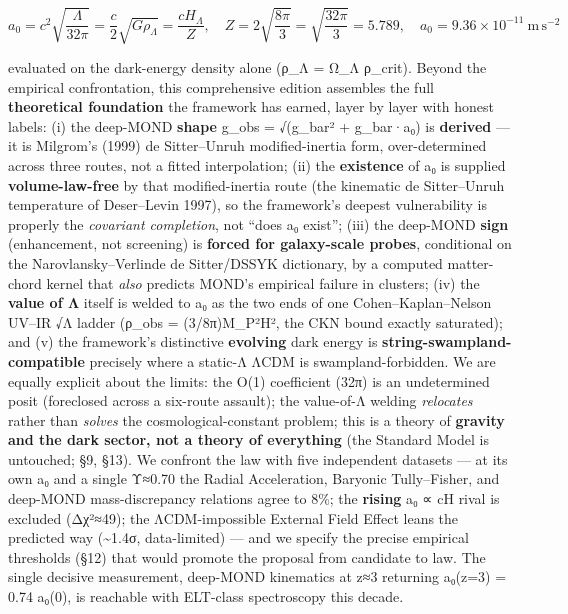 \documentclass[
]{article}
\begin{document}
\[a_0 = c^2\sqrt{\frac{\Lambda}{32\pi}} = \frac{c}{2}\sqrt{G\rho_\Lambda} = \frac{cH_\Lambda}{Z}, \quad Z = 2\sqrt{\frac{8\pi}{3}} = \sqrt{\frac{32\pi}{3}} = 5.789, \quad a_0 = 9.36\times10^{-11}\ \mathrm{m\,s^{-2}}\]

evaluated on the dark-energy density alone (ρ\_Λ = Ω\_Λ ρ\_crit). Beyond
the empirical confrontation, this comprehensive edition assembles the
full \textbf{theoretical foundation} the framework has earned, layer by
layer with honest labels: (i) the deep-MOND \textbf{shape} g\_obs =
√(g\_bar² + g\_bar·a₀) is \textbf{derived} --- it is Milgrom's (1999) de
Sitter--Unruh modified-inertia form, over-determined across three
routes, not a fitted interpolation; (ii) the \textbf{existence} of a₀ is
supplied \textbf{volume-law-free} by that modified-inertia route (the
kinematic de Sitter--Unruh temperature of Deser--Levin 1997), so the
framework's deepest vulnerability is properly the \emph{covariant
completion}, not ``does a₀ exist''; (iii) the deep-MOND \textbf{sign}
(enhancement, not screening) is \textbf{forced for galaxy-scale probes},
conditional on the Narovlansky--Verlinde de Sitter/DSSYK dictionary, by
a computed matter-chord kernel that \emph{also} predicts MOND's
empirical failure in clusters; (iv) the \textbf{value of Λ} itself is
welded to a₀ as the two ends of one Cohen--Kaplan--Nelson UV--IR √Λ
ladder (ρ\_obs = (3/8π)M\_P²H², the CKN bound exactly saturated); and
(v) the framework's distinctive \textbf{evolving} dark energy is
\textbf{string-swampland-compatible} precisely where a static-Λ ΛCDM is
swampland-forbidden. We are equally explicit about the limits: the O(1)
coefficient (32π) is an undetermined posit (foreclosed across a
six-route assault); the value-of-Λ welding \emph{relocates} rather than
\emph{solves} the cosmological-constant problem; this is a theory of
\textbf{gravity and the dark sector, not a theory of everything} (the
Standard Model is untouched; §9, §13). We confront the law with five
independent datasets --- at its own a₀ and a single Υ≈0.70 the Radial
Acceleration, Baryonic Tully--Fisher, and deep-MOND mass-discrepancy
relations agree to 8\%; the \textbf{rising} a₀ ∝ cH rival is excluded
(Δχ²≈49); the ΛCDM-impossible External Field Effect leans the predicted
way (\textasciitilde1.4σ, data-limited) --- and we specify the precise
empirical thresholds (§12) that would promote the proposal from
candidate to law. The single decisive measurement, deep-MOND kinematics
at z≈3 returning a₀(z=3) = 0.74 a₀(0), is reachable with ELT-class
spectroscopy this decade.
\end{document}
